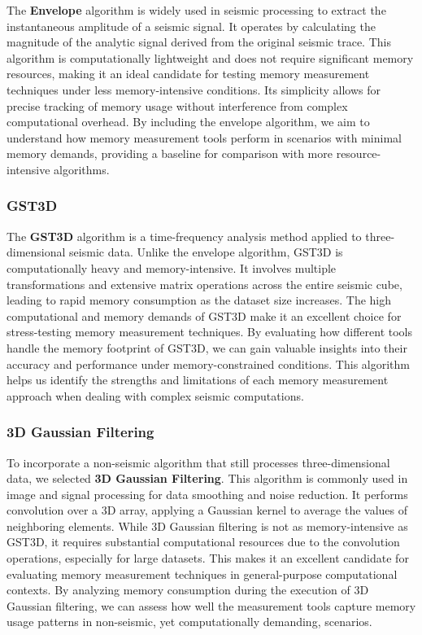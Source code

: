 The \textbf{Envelope} algorithm is widely used in seismic processing to extract the instantaneous amplitude of a seismic signal.
It operates by calculating the magnitude of the analytic signal derived from the original seismic trace.
This algorithm is computationally lightweight and does not require significant memory resources, making it an ideal candidate for testing memory measurement techniques under less memory-intensive conditions.
Its simplicity allows for precise tracking of memory usage without interference from complex computational overhead.
By including the envelope algorithm, we aim to understand how memory measurement tools perform in scenarios with minimal memory demands, providing a baseline for comparison with more resource-intensive algorithms.


\subsubsection{\ac{GST3D}}

The \textbf{\ac{GST3D}} algorithm is a time-frequency analysis method applied to three-dimensional seismic data.
Unlike the envelope algorithm, \ac{GST3D} is computationally heavy and memory-intensive.
It involves multiple transformations and extensive matrix operations across the entire seismic cube, leading to rapid memory consumption as the dataset size increases.
The high computational and memory demands of \ac{GST3D} make it an excellent choice for stress-testing memory measurement techniques.
By evaluating how different tools handle the memory footprint of \ac{GST3D}, we can gain valuable insights into their accuracy and performance under memory-constrained conditions.
This algorithm helps us identify the strengths and limitations of each memory measurement approach when dealing with complex seismic computations.


\subsubsection{3D Gaussian Filtering}

To incorporate a non-seismic algorithm that still processes three-dimensional data, we selected \textbf{3D Gaussian Filtering}.
This algorithm is commonly used in image and signal processing for data smoothing and noise reduction.
It performs convolution over a 3D array, applying a Gaussian kernel to average the values of neighboring elements.
While 3D Gaussian filtering is not as memory-intensive as \ac{GST3D}, it requires substantial computational resources due to the convolution operations, especially for large datasets.
This makes it an excellent candidate for evaluating memory measurement techniques in general-purpose computational contexts.
By analyzing memory consumption during the execution of 3D Gaussian filtering, we can assess how well the measurement tools capture memory usage patterns in non-seismic, yet computationally demanding, scenarios.

